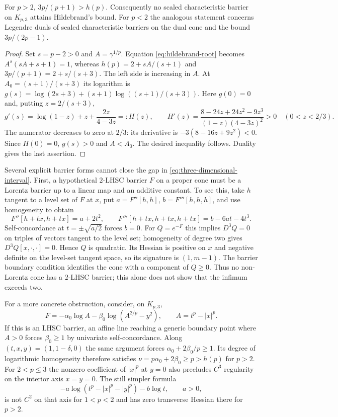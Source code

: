 \begin{proposition}
\label{prop:characteristic-strict-gap}
For $p>2$, $3p/(p+1)>h(p)$. Consequently no scaled characteristic
barrier on $K_{p,3}$ attains Hildebrand's bound. For $p<2$ the analogous
statement concerns Legendre duals of scaled characteristic barriers on
the dual cone and the bound $3p/(2p-1)$.
\end{proposition}
\begin{proof}
Set $s=p-2>0$ and $A=\gamma^{1/p}$. Equation
\eqref{eq:hildebrand-root} becomes
$A^s(sA+s+1)=1$, whereas
$h(p)=2+sA/(s+1)$ and $3p/(p+1)=2+s/(s+3)$.
The left side is increasing in $A$. At $A_0=(s+1)/(s+3)$ its
logarithm is
$g(s)=\log(2s+3)+(s+1)\log((s+1)/(s+3))$.
Here $g(0)=0$ and, putting $z=2/(s+3)$,
\[
 g'(s)=\log(1-z)+z+\frac{2z}{4-3z}=:H(z),\qquad
 H'(z)=\frac{8-24z+24z^2-9z^3}{(1-z)(4-3z)^2}>0
 \quad(0<z<2/3).
\]
The numerator decreases to zero at $2/3$: its derivative is
$-3(8-16z+9z^2)<0$. Since $H(0)=0$, $g(s)>0$ and $A<A_0$.
The desired inequality follows. Duality gives the last assertion.
\end{proof}

Several explicit barrier forms cannot close the gap in
\eqref{eq:three-dimensional-interval}. First, a hypothetical
$2$-LHSC barrier $F$ on a proper cone must be a Lorentz barrier up to
a linear map and an additive constant. To see this, take $h$ tangent
to a level set of $F$ at $x$, put $a=F''[h,h]$, $b=F'''[h,h,h]$, and
use homogeneity to obtain
\[
 F''[h+tx,h+tx]=a+2t^2,\qquad
 F'''[h+tx,h+tx,h+tx]=b-6at-4t^3.
\]
Self-concordance at $t=\pm\sqrt{a/2}$ forces $b=0$.
For $Q=e^{-F}$ this implies $D^3Q=0$ on triples of vectors tangent to
the level set; homogeneity of degree two gives $D^3Q[x,\cdot,\cdot]=0$.
Hence $Q$ is quadratic. Its Hessian is positive on $x$ and negative
definite on the level-set tangent space, so its signature is
$(1,m-1)$. The barrier boundary
condition identifies the cone with a component of $Q\geq0$.
Thus no non-Lorentz cone has a $2$-LHSC barrier; this alone does not
show that the infimum exceeds two.

For a more concrete obstruction, consider, on $K_{p,3}$,
\[
 F=-\alpha_0\log A-\beta_0\log(A^{2/p}-y^2),\qquad
 A=t^p-|x|^p.
\]
If this is an LHSC barrier, an affine line reaching a generic boundary
point where $A>0$ forces $\beta_0\geq1$ by univariate
self-concordance. Along $(t,x,y)=(1,1-\delta,0)$ the same argument
forces $\alpha_0+2\beta_0/p\geq1$. Its degree of logarithmic homogeneity therefore satisfies
$\nu=p\alpha_0+2\beta_0\geq p>h(p)$ for $p>2$.
For $2<p\leq3$ the nonzero coefficient of $|x|^p$ at $y=0$ also
precludes $C^3$ regularity on the interior axis $x=y=0$.
The still simpler formula
\[
 -a\log(t^p-|x|^p-|y|^p)-b\log t,\qquad a>0,
\]
is not $C^2$ on that axis for $1<p<2$ and has zero transverse Hessian
there for $p>2$.

